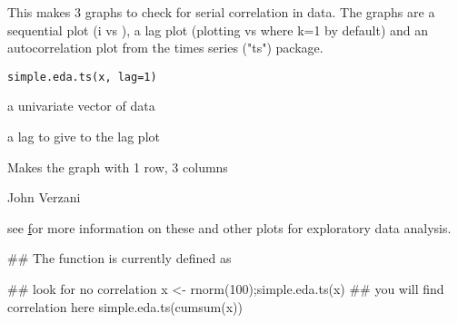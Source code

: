 \begin{Description}\relax
This makes 3 graphs to check for serial correlation in data. The
graphs are a sequential plot (i vs ), a lag plot
(plotting  vs  where k=1 by default)
and an autocorrelation plot from the times series ("ts") package.
\end{Description}
\begin{Usage}
\begin{verbatim}
simple.eda.ts(x, lag=1)
\end{verbatim}
\end{Usage}
\begin{Arguments}
\begin{ldescription}
\item[\code{x}] a univariate vector of data 
\item[\code{lag}] a lag to give to the lag plot 
\end{ldescription}
\end{Arguments}
\begin{Value}
Makes the graph with 1 row, 3 columns
\end{Value}
\begin{Author}\relax
John Verzani
\end{Author}
\begin{References}\relax
see
\href{http://www.itl.nist.gov/div898/handbook/eda/section3/eda34.htm}
for more information on these and other plots for exploratory data analysis.
\end{References}
\begin{Examples}
\begin{ExampleCode}
## The function is currently defined as

## look for no correlation
x <- rnorm(100);simple.eda.ts(x)
## you will find correlation here
simple.eda.ts(cumsum(x))
\end{ExampleCode}
\end{Examples}

